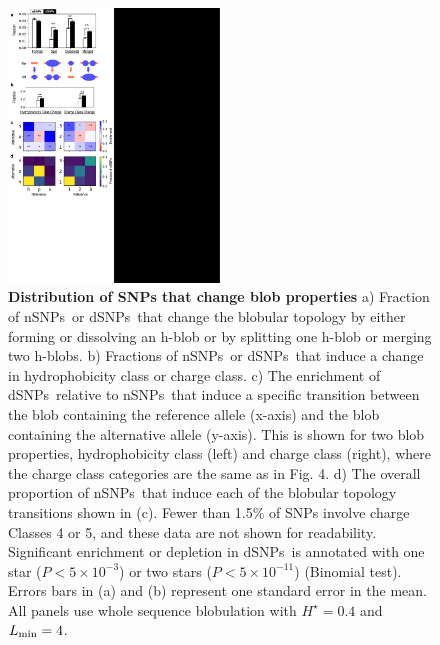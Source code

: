 \documentclass[9pt,twocolumn,twoside,lineno]{pnas-new}
\newcommand{\dSNPs}{dSNPs~}
\newcommand{\nSNPs}{nSNPs~}
\newcommand{\hydrochar}{hydrophobicity class}
\newcommand{\chargechar}{charge class}
\newcommand{\Ht}{H^{\star}}
\newcommand{\Lmin}{L_{\rm min}}
\begin{document}
\begin{figure}
\includegraphics[width=0.5\textwidth,trim={0 0cm 0 0cm},clip]{fig5.pdf}
\caption{{\bf Distribution of SNPs that change blob properties}  a) Fraction of \nSNPs or \dSNPs that change the blobular topology by either forming or dissolving an h-blob or by splitting one h-blob or merging two h-blobs. b) Fractions of \nSNPs or \dSNPs that induce a change in \hydrochar{} or \chargechar.  c) The enrichment of \dSNPs relative to \nSNPs that induce a specific transition between the blob containing the reference allele (x-axis) and the blob containing the alternative allele (y-axis). This is shown for two blob properties, \hydrochar{} (left) and \chargechar{} (right), where the \chargechar{} categories are the same as in Fig. 4. d) The overall proportion of \nSNPs that induce each of the blobular topology transitions shown in (c).  Fewer than 1.5\% of SNPs involve charge Classes 4 or 5, and these data are not shown for readability. Significant enrichment or depletion in \dSNPs is annotated with one star ($P< 5\times 10^{-3}$) or two stars ($P< 5\times 10^{-11}$) (Binomial test). Errors bars in (a) and (b) represent one standard error in the mean.
All panels use whole sequence blobulation with $\Ht=0.4$ and $\Lmin=4$.}
\label{c3_h_p_enrich}
\end{figure}
\end{document}
